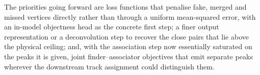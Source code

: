The priorities going forward are loss functions that penalise fake,
merged and missed vertices directly rather than through a uniform mean-squared
error, with an in-model objectness head as the concrete first step; a finer output
representation or a deconvolution step to recover the close pairs that lie above the
physical ceiling; and, with the association step now essentially saturated on the
peaks it is given, joint finder--associator objectives that emit separate peaks
wherever the downstream track assignment could distinguish them.
